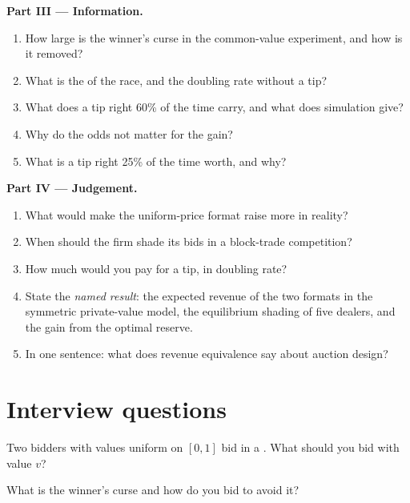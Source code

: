 \begin{problem}
\medskip\noindent\textbf{Part III --- Information.}
\begin{enumerate}[resume]
\item How large is the winner's curse in the common-value experiment, and how is it removed?
\item What is the  of the race, and the doubling rate without a tip?
\item What does a tip right 60\% of the time carry, and what does simulation give?
\item Why do the odds not matter for the gain?
\item What is a tip right 25\% of the time worth, and why?
\end{enumerate}

\medskip\noindent\textbf{Part IV --- Judgement.}
\begin{enumerate}[resume]
\item What would make the uniform-price format raise more in reality?
\item When should the firm shade its bids in a block-trade competition?
\item How much would you pay for a tip, in doubling rate?
\item State the \emph{named result}: the expected revenue of the two formats in the symmetric private-value model, the equilibrium shading of five dealers, and the gain from the optimal reserve.
\item In one sentence: what does revenue equivalence say about auction design?
\end{enumerate}
\end{problem}

\section{Interview questions}

\begin{interviewq}\label{iq:qm:games-auctions-and-information:1}
Two bidders with values uniform on $[0, 1]$ bid in a . What should you bid with value $v$?
\end{interviewq}

\begin{interviewq}\label{iq:qm:games-auctions-and-information:2}
What is the winner's curse and how do you bid to avoid it?
\end{interviewq}

